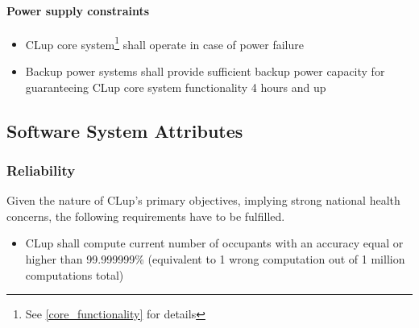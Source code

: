 \paragraph{Power supply constraints}
\label{par:powerSupply}

\begin{itemize}[leftmargin=+.8in]
    \item[\ref{par:powerSupply}.2.1] CLup core system\footnote{See \ref{core_functionality} for details} shall operate in case of power failure
    \item[\ref{par:powerSupply}.2.2] Backup power systems shall provide sufficient backup power capacity for guaranteeing CLup core system functionality 4 hours and up
\end{itemize}

\subsection{Software System Attributes}

\subsubsection{Reliability \label{subsub:reliability}}
Given the nature of CLup's primary objectives, implying strong national health concerns, the following requirements have to be fulfilled.\newline
\begin{itemize}[leftmargin=+.8in]
    \item[\ref{subsub:reliability}.1] CLup shall compute current number of occupants with an accuracy equal or higher than 99.999999\% (equivalent to 1 wrong computation out of 1 million computations total)
\end{itemize}

